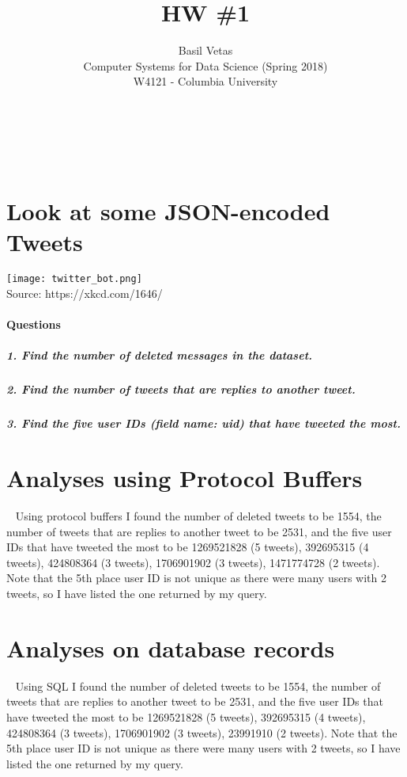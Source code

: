 \documentclass[12pt]{article}
\let\oldsection\section
\renewcommand\section{\clearpage\oldsection}
\begin{document}
 

\title{HW \#1}%
\author{Basil Vetas\\ %
Computer Systems for Data Science (Spring 2018)\\
W4121 - Columbia University} %
\maketitle
~~~~~~~~~~~~~~~~~~~~~~~~~~~~~~~~~~~~~~~~~~~~~~~~~~~~~~~~~~~~~~~~~~~~~~~~~~~~~

\section{Look at some JSON-encoded Tweets}

\texttt{[image: twitter\_bot.png]}
\\Source: https://xkcd.com/1646/

\paragraph{Questions}

\subparagraph{1. Find the number of deleted messages in the dataset.}
\subparagraph{2. Find the number of tweets that are replies to another tweet.}
\subparagraph{3. Find the five user IDs (field name: uid) that have tweeted the most.}

\section{Analyses using Protocol Buffers} ~
Using protocol buffers I found the number of deleted tweets to be 1554, the number of tweets that are replies to another tweet to be 2531, and the five user IDs that have tweeted the most to be 1269521828 (5 tweets), 392695315 (4 tweets), 424808364 (3 tweets), 1706901902 (3 tweets), 1471774728 (2 tweets). Note that the 5th place user ID is not unique as there were many users with 2 tweets, so I have listed the one returned by my query.



\section{Analyses on database records} ~
Using SQL I found the number of deleted tweets to be 1554, the number of tweets that are replies to another tweet to be 2531, and the five user IDs that have tweeted the most to be 1269521828 (5 tweets), 392695315 (4 tweets), 424808364 (3 tweets), 1706901902 (3 tweets), 23991910 (2 tweets). Note that the 5th place user ID is not unique as there were many users with 2 tweets, so I have listed the one returned by my query.
\end{document}

